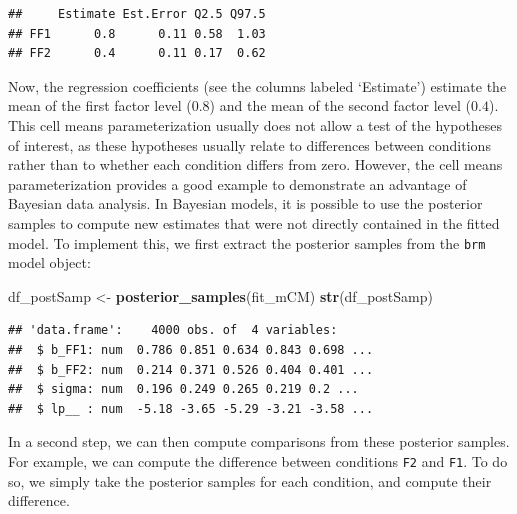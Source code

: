 \documentclass[12pt,]{krantz}
\newenvironment{Shaded}{\begin{snugshade}}{\end{snugshade}}
\newcommand{\KeywordTok}[1]{\textcolor[rgb]{0.13,0.29,0.53}{\textbf{#1}}}
\newcommand{\StringTok}[1]{\textcolor[rgb]{0.31,0.60,0.02}{#1}}
\newcommand{\OperatorTok}[1]{\textcolor[rgb]{0.81,0.36,0.00}{\textbf{#1}}}
\newcommand{\NormalTok}[1]{#1}
\theoremstyle{definition}
\theoremstyle{definition}
\theoremstyle{definition}
\theoremstyle{remark}
\begin{document}
\begin{verbatim}
##     Estimate Est.Error Q2.5 Q97.5
## FF1      0.8      0.11 0.58  1.03
## FF2      0.4      0.11 0.17  0.62
\end{verbatim}

Now, the regression coefficients (see the columns labeled `Estimate')
estimate the mean of the first factor level (\(0.8\)) and the mean of
the second factor level (\(0.4\)). This cell means parameterization
usually does not allow a test of the hypotheses of interest, as these
hypotheses usually relate to differences between conditions rather than
to whether each condition differs from zero. However, the cell means
parameterization provides a good example to demonstrate an advantage of
Bayesian data analysis. In Bayesian models, it is possible to use the
posterior samples to compute new estimates that were not directly
contained in the fitted model. To implement this, we first extract the
posterior samples from the \texttt{brm} model object:

\begin{Shaded}
\begin{Highlighting}[]
\NormalTok{df_postSamp <-}\StringTok{ }\KeywordTok{posterior_samples}\NormalTok{(fit_mCM)}
\KeywordTok{str}\NormalTok{(df_postSamp)}
\end{Highlighting}
\end{Shaded}

\begin{verbatim}
## 'data.frame':    4000 obs. of  4 variables:
##  $ b_FF1: num  0.786 0.851 0.634 0.843 0.698 ...
##  $ b_FF2: num  0.214 0.371 0.526 0.404 0.401 ...
##  $ sigma: num  0.196 0.249 0.265 0.219 0.2 ...
##  $ lp__ : num  -5.18 -3.65 -5.29 -3.21 -3.58 ...
\end{verbatim}

In a second step, we can then compute comparisons from these posterior
samples. For example, we can compute the difference between conditions
\texttt{F2} and \texttt{F1}. To do so, we simply take the posterior
samples for each condition, and compute their difference.

\begin{Shaded}
\end{Shaded}
\end{document}
